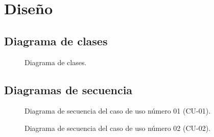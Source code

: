 \chapter{Diseño}	

\section{Diagrama de clases}

\begin{figure}[htbp!]
	\begin{center}
		\caption{Diagrama de clases.}
		\label{fig:Diagrama de clases}
	\end{center}
\end{figure}

\section{Diagramas de secuencia}

\begin{figure}[htbp!]
	\begin{center}
		\caption{Diagrama de secuencia del caso de uso número 01 (CU-01).}
		\label{fig:Diagrama de secuencia CU-01}
	\end{center}
\end{figure}

\begin{figure}[htbp!]
	\begin{center}
		\caption{Diagrama de secuencia del caso de uso número 02 (CU-02).}
		\label{fig:Diagrama de secuencia CU-02}
	\end{center}
\end{figure}

